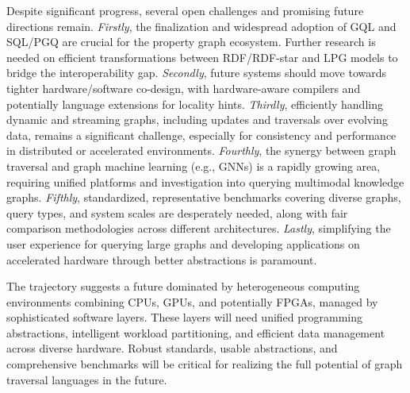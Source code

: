 \documentclass[sigconf,natbib=false]{acmart}
\begin{document}
Despite significant progress, several open challenges and promising future directions remain.
\textit{Firstly}, the finalization and widespread adoption of GQL and SQL/PGQ are crucial for the property graph ecosystem.
Further research is needed on efficient transformations between RDF/RDF-star and LPG models to bridge the interoperability gap.
\textit{Secondly}, future systems should move towards tighter hardware/software co-design, with hardware-aware compilers and potentially language extensions for locality hints.
\textit{Thirdly}, efficiently handling dynamic and streaming graphs, including updates and traversals over evolving data, remains a significant challenge, especially for consistency and performance in distributed or accelerated environments.
\textit{Fourthly}, the synergy between graph traversal and graph machine learning (e.g., GNNs) is a rapidly growing area, requiring unified platforms and investigation into querying multimodal knowledge graphs.
\textit{Fifthly}, standardized, representative benchmarks covering diverse graphs, query types, and system scales are desperately needed, along with fair comparison methodologies across different architectures.
\textit{Lastly}, simplifying the user experience for querying large graphs and developing applications on accelerated hardware through better abstractions is paramount.

The trajectory suggests a future dominated by heterogeneous computing environments combining CPUs, GPUs, and potentially FPGAs, managed by sophisticated software layers.
These layers will need unified programming abstractions, intelligent workload partitioning, and efficient data management across diverse hardware.
Robust standards, usable abstractions, and comprehensive benchmarks will be critical for realizing the full potential of graph traversal languages in the future.

\printbibliography
\end{document}

